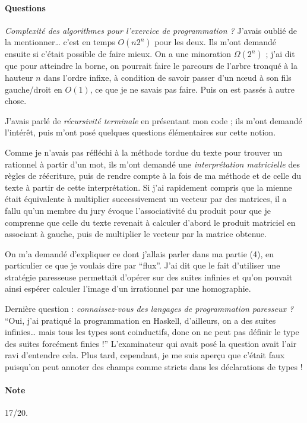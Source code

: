 \documentclass[a4paper, 11pt]{article}
\begin{document}
\paragraph{Questions} \emph{Complexité des algorithmes pour l'exercice de
  programmation ?} J'avais oublié de la mentionner… c'est en temps $O(n 2^n)$
pour les deux. Ils m'ont demandé ensuite si c'était possible de faire mieux. On
a une minoration $\Omega(2^n)$ ; j'ai dit que pour atteindre la borne, on
pourrait faire le parcours de l'arbre tronqué à la hauteur $n$ dans l'ordre
infixe, à condition de savoir passer d'un nœud à son fils gauche/droit en
$O(1)$, ce que je ne savais pas faire. Puis on est passés à autre chose.

J'avais parlé de \emph{récursivité terminale} en présentant mon code ; ils m'ont
demandé l'intérêt, puis m'ont posé quelques questions élémentaires sur cette
notion.

Comme je n'avais pas réfléchi à la méthode tordue du texte pour trouver un
rationnel à partir d'un mot, ils m'ont demandé une \emph{interprétation
  matricielle} des règles de réécriture, puis de rendre compte à la fois de ma
méthode et de celle du texte à partir de cette interprétation. Si j'ai
rapidement compris que la mienne était équivalente à multiplier successivement
un vecteur par des matrices, il a fallu qu'un membre du jury évoque
l'associativité du produit pour que je comprenne que celle du texte revenait à
calculer d'abord le produit matriciel en associant à gauche, puis de multiplier
le vecteur par la matrice obtenue.

On m'a demandé d'expliquer ce dont j'allais parler dans ma partie (4), en
particulier ce que je voulais dire par \enquote{flux}. J'ai dit que le fait
d'utiliser une stratégie paresseuse permettait d'opérer sur des suites infinies
et qu'on pouvait ainsi espérer calculer l'image d'un irrationnel par une
homographie.

Dernière question : \emph{connaissez-vous des langages de programmation
  paresseux ?} \enquote{Oui, j'ai pratiqué la programmation en Haskell,
  d'ailleurs, on a des suites infinies… mais tous les types sont coinductifs,
  donc on ne peut pas définir le type des suites forcément finies !}
L'examinateur qui avait posé la question avait l'air ravi d'entendre cela. Plus
tard, cependant, je me suis aperçu que c'était faux puisqu'on peut annoter des
champs comme stricts dans les déclarations de types !

\paragraph{Note} 17/20.
\end{document}
